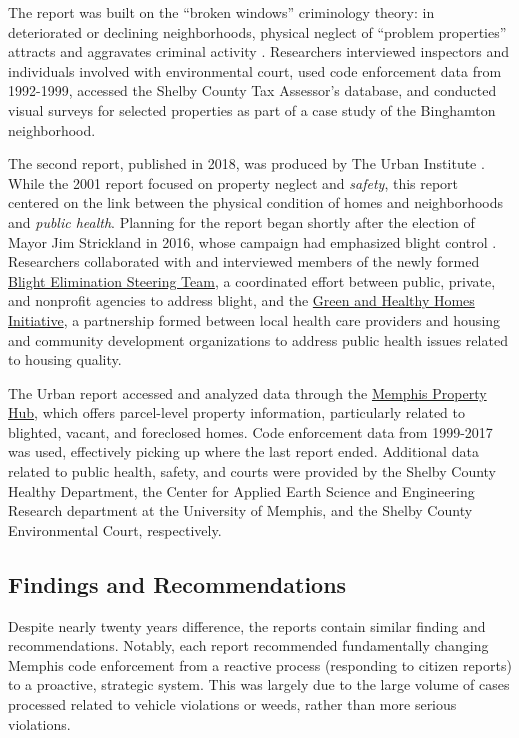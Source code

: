 \documentclass[
]{book}
\begin{document}
The report was built on the ``broken windows'' criminology theory: in deteriorated or declining neighborhoods, physical neglect of ``problem properties'' attracts and aggravates criminal activity \citep{betts2001}. Researchers interviewed inspectors and individuals involved with environmental court, used code enforcement data from 1992-1999, accessed the Shelby County Tax Assessor's database, and conducted visual surveys for selected properties as part of a case study of the Binghamton neighborhood.

The second report, published in 2018, was produced by The Urban Institute \citep{stacy2018}. While the 2001 report focused on property neglect and \emph{safety}, this report centered on the link between the physical condition of homes and neighborhoods and \emph{public health}. Planning for the report began shortly after the election of Mayor Jim Strickland in 2016, whose campaign had emphasized blight control \citep{baker2018}. Researchers collaborated with and interviewed members of the newly formed \href{http://memphisfightsblight.com/blight-elimination-steering-team/}{Blight Elimination Steering Team}, a coordinated effort between public, private, and nonprofit agencies to address blight, and the \href{https://www.greenandhealthyhomes.org/location/memphis-tn/}{Green and Healthy Homes Initiative}, a partnership formed between local health care providers and housing and community development organizations to address public health issues related to housing quality.

The Urban report accessed and analyzed data through the \href{http://memphisfightsblight.com/programs/mph/}{Memphis Property Hub}, which offers parcel-level property information, particularly related to blighted, vacant, and foreclosed homes. Code enforcement data from 1999-2017 was used, effectively picking up where the last report ended. Additional data related to public health, safety, and courts were provided by the Shelby County Healthy Department, the Center for Applied Earth Science and Engineering Research department at the University of Memphis, and the Shelby County Environmental Court, respectively.

\hypertarget{findings-and-recommendations}{%
\subsection{Findings and Recommendations}\label{findings-and-recommendations}}

Despite nearly twenty years difference, the reports contain similar finding and recommendations. Notably, each report recommended fundamentally changing Memphis code enforcement from a reactive process (responding to citizen reports) to a proactive, strategic system. This was largely due to the large volume of cases processed related to vehicle violations or weeds, rather than more serious violations.
\end{document}
